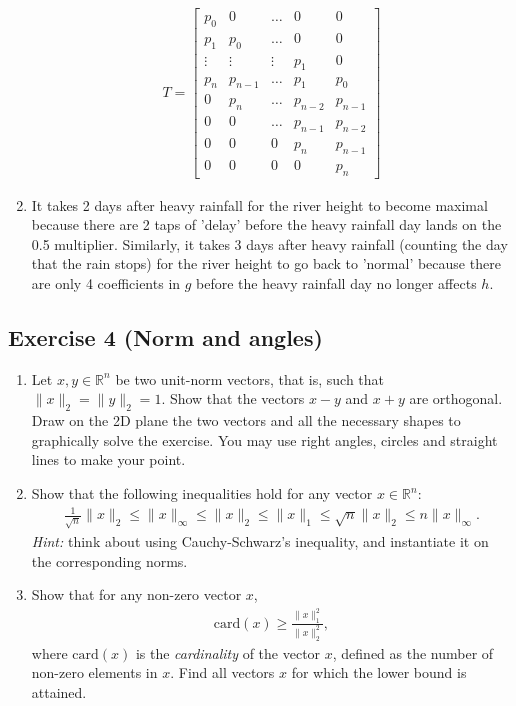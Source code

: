 \documentclass[11pt]{article}
\begin{document}
\begin{solution}
\begin{enumerate}
    \begin{align*}
    T =
    \begin{bmatrix}
        p_0 & 0 & \dots & 0 & 0 \\
        p_1 & p_0 & \dots & 0 & 0 \\
        \vdots & \vdots & \vdots & p_1 & 0 \\
        p_{n} & p_{n-1} & \dots & p_1 & p_0 \\
        0 & p_n & \dots & p_{n-2} & p_{n-1} \\
        0 & 0 & \dots & p_{n-1} & p_{n-2} \\
        0 & 0 & 0 & p_{n} & p_{n-1} \\
        0 & 0 & 0 & 0 & p_n
    \end{bmatrix}
    \end{align*}
\item It takes 2 days after heavy rainfall for the river height to become maximal because there are 2 taps of 'delay' before the heavy rainfall day lands on the 0.5 multiplier. Similarly, it takes 3 days after heavy rainfall (counting the day that the rain stops) for the river height to go back to 'normal' because there are only 4 coefficients in $g$ before the heavy rainfall day no longer affects $h$.
\end{enumerate}
\end{solution}

\newpage
\subsection*{Exercise 4 (Norm and angles)}

\begin{enumerate}
    \item Let $x,y\in\mathbb{R}^{n}$ be two unit-norm vectors, that is, such that $\|x\|_2 = \|y\|_2=1$. Show that the vectors $x-y$ and $x+y$ are orthogonal. Draw on the 2D plane the two vectors and all the necessary shapes to graphically solve the exercise. You may use right angles, circles and straight lines to make your point.

    \item
    Show that the following inequalities hold for any vector $x \in \mathbb{R}^{n}$:
    \begin{align*}
        \frac{1}{\sqrt{n}}\|x\|_2 \leq \|x\|_\infty \leq  \|x\|_2 \leq \|x\|_1 \leq \sqrt{n} \|x\|_2 \le n\|x\|_\infty.
    \end{align*}
    \textit{Hint:} think about using Cauchy-Schwarz's inequality, and instantiate it on the corresponding norms.

    \item Show that for any non-zero vector $x$,
    \begin{align*}
        \text{card}(x) \ge \frac{\|x\|_1^2}{\|x\|_2^2},
    \end{align*}
    where $\text{card}(x)$ is the \emph{cardinality} of the vector $x$, defined as the number of non-zero elements in $x$. Find all vectors $x$ for which the lower bound is attained.
\end{enumerate}
\end{document}
